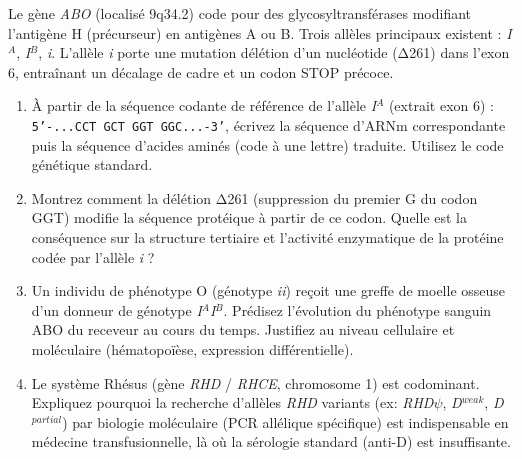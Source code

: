 \documentclass[11pt]{article}
\begin{document}
\begin{exercice}
Le gène \textit{ABO} (localisé 9q34.2) code pour des glycosyltransférases modifiant l'antigène H (précurseur) en antigènes A ou B. Trois allèles principaux existent : \textit{I$^A$}, \textit{I$^B$}, \textit{i}. L'allèle \textit{i} porte une mutation délétion d'un nucléotide (Δ261) dans l'exon 6, entraînant un décalage de cadre et un codon STOP précoce.

\begin{enumerate}
    \item À partir de la séquence codante de référence de l'allèle \textit{I$^A$} (extrait exon 6) : \texttt{5'-...CCT GCT GGT GGC...-3'}, écrivez la séquence d'ARNm correspondante puis la séquence d'acides aminés (code à une lettre) traduite. Utilisez le code génétique standard.
    \item Montrez comment la délétion Δ261 (suppression du premier G du codon GGT) modifie la séquence protéique à partir de ce codon. Quelle est la conséquence sur la structure tertiaire et l'activité enzymatique de la protéine codée par l'allèle \textit{i} ?
    \item Un individu de phénotype O (génotype \textit{ii}) reçoit une greffe de moelle osseuse d'un donneur de génotype \textit{I$^A$I$^B$}. Prédisez l'évolution du phénotype sanguin ABO du receveur au cours du temps. Justifiez au niveau cellulaire et moléculaire (hématopoïèse, expression différentielle).
    \item Le système Rhésus (gène \textit{RHD} / \textit{RHCE}, chromosome 1) est codominant. Expliquez pourquoi la recherche d'allèles \textit{RHD} variants (ex: \textit{RHD}$\psi$, \textit{D$^{weak}$}, \textit{D$^{partial}$}) par biologie moléculaire (PCR allélique spécifique) est indispensable en médecine transfusionnelle, là où la sérologie standard (anti-D) est insuffisante.
\end{enumerate}
\end{exercice}
\end{document}
